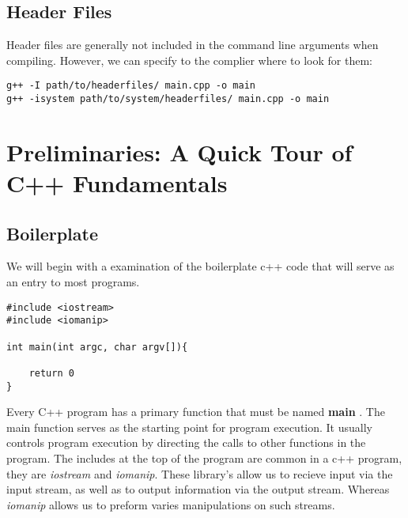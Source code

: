 \documentclass{report}
\begin{document}
    \bigbreak \noindent 
    \subsection{Header Files}
    Header files are generally not included in the command line arguments when compiling. However, we can specify to the complier where to look for them:
    \bigbreak \noindent 
    \sepline
    \begin{verbatim}
g++ -I path/to/headerfiles/ main.cpp -o main
g++ -isystem path/to/system/headerfiles/ main.cpp -o main
    \end{verbatim}
    \sepline
















    \pagebreak \bigbreak \noindent 
    \section{\LARGE Preliminaries: A Quick Tour of C++ Fundamentals}
    \bigbreak \noindent 
    \subsection{Boilerplate}
    \bigbreak \noindent 
    We will begin with a examination of the boilerplate c++ code that will serve as an entry to most programs.
    \sepline
    \begin{verbatim}
#include <iostream>
#include <iomanip>

int main(int argc, char argv[]){

    return 0
}
    \end{verbatim}
    \sepline
    \bigbreak \noindent 
    Every C++ program has a primary function that must be named \textbf{main} . The main function serves as the starting point for program execution. It usually controls program execution by directing the calls to other functions in the program.
    \bigbreak \noindent 
    The includes at the top of the program are common in a c++ program, they are \textit{iostream} and \textit{iomanip}. These library's allow us to recieve input via the input stream, as well as to output information  via the output stream. Whereas \textit{iomanip} allows us to preform varies manipulations on such streams.
    \bigbreak \noindent 
\end{document}
